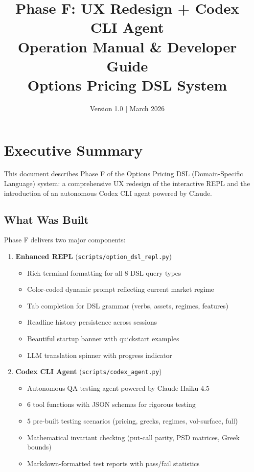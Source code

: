 \documentclass[12pt,oneside,openany]{book}
\title{
    \textbf{Phase F: UX Redesign + Codex CLI Agent}\\
    \Large Operation Manual \& Developer Guide\\
    \vspace{0.5cm}
    \normalsize Options Pricing DSL System
}
\author{Version 1.0 | March 2026}
\date{}
\begin{document}
\maketitle

\tableofcontents
\newpage

\chapter{Executive Summary}

This document describes Phase F of the Options Pricing DSL (Domain-Specific Language) system: a comprehensive UX redesign of the interactive REPL and the introduction of an autonomous Codex CLI agent powered by Claude.

\section{What Was Built}

Phase F delivers two major components:

\begin{enumerate}
    \item \textbf{Enhanced REPL} (\texttt{scripts/option\_dsl\_repl.py})
    \begin{itemize}
        \item Rich terminal formatting for all 8 DSL query types
        \item Color-coded dynamic prompt reflecting current market regime
        \item Tab completion for DSL grammar (verbs, assets, regimes, features)
        \item Readline history persistence across sessions
        \item Beautiful startup banner with quickstart examples
        \item LLM translation spinner with progress indicator
    \end{itemize}

    \item \textbf{Codex CLI Agent} (\texttt{scripts/codex\_agent.py})
    \begin{itemize}
        \item Autonomous QA testing agent powered by Claude Haiku 4.5
        \item 6 tool functions with JSON schemas for rigorous testing
        \item 5 pre-built testing scenarios (pricing, greeks, regimes, vol-surface, full)
        \item Mathematical invariant checking (put-call parity, PSD matrices, Greek bounds)
        \item Markdown-formatted test reports with pass/fail statistics
    \end{itemize}
\end{enumerate}
\end{document}
